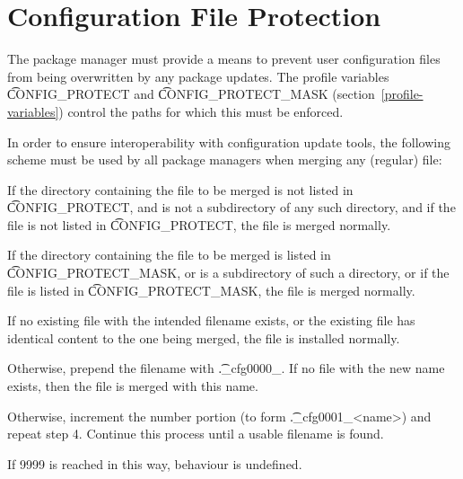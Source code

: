 \chapter{Configuration File Protection}
\label{config-protect}

The package manager must provide a means to prevent user configuration files from being
overwritten by any package updates. The profile variables \t{CONFIG\_PROTECT} and
\t{CONFIG\_PROTECT\_MASK} (section~\ref{profile-variables}) control the paths for which this
must be enforced.

In order to ensure interoperability with configuration update tools, the following scheme must be
used by all package managers when merging any (regular) file:

\begin{compactenum}
\item If the directory containing the file to be merged is not listed in \t{CONFIG\_PROTECT}, and
     is not a subdirectory of any such directory, and if the file is not listed in \t{CONFIG\_PROTECT},
     the file is merged normally.
\item If the directory containing the file to be merged is listed in \t{CONFIG\_PROTECT\_MASK}, or
    is a subdirectory of such a directory, or if the file is listed in \t{CONFIG\_PROTECT\_MASK},
    the file is merged normally.
\item If no existing file with the intended filename exists, or the existing file has identical
    content to the one being merged, the file is installed normally.
\item Otherwise, prepend the filename with \t{.\_cfg0000\_}. If no file with the new name exists,
    then the file is merged with this name.
\item Otherwise, increment the number portion (to form \t{.\_cfg0001\_<name>}) and repeat step 4.
    Continue this process until a usable filename is found.
\item If 9999 is reached in this way, behaviour is undefined.
\end{compactenum}


